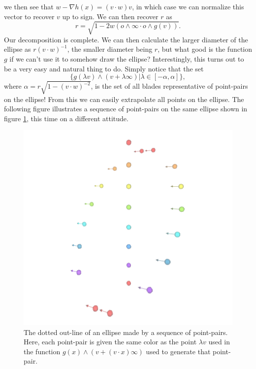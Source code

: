 \documentclass[12pt]{article}
\newcommand{\nvao}{o}
\newcommand{\nvai}{\infty}
\begin{document}
we then see that $w-\nabla h(x)=(v\cdot w)v$, in which case we can normalize
this vector to recover $v$ up to sign.  We can then recover $r$ as
\begin{equation*}
r = \sqrt{1-2w(\nvao\wedge\nvai\cdot\nvao\wedge g(v))}.
\end{equation*}
Our decomposition is complete.  We can then calculate the larger
diameter of the ellipse as $r(v\cdot w)^{-1}$, the smaller
diameter being $r$, but what good is the function $g$ if we can't
use it to somehow draw the ellipse?  Interestingly, this turns out to be a very
easy and natural thing to do.  Simply notice that the set
\begin{equation*}
\{g(\lambda v)\wedge(v+\lambda\nvai) | \lambda\in[-\alpha,\alpha]\},
\end{equation*}
where $\alpha=r\sqrt{1-(v\cdot w)^{-2}}$, is the set of all blades representative
of point-pairs on the ellipse!  From this we can easily extrapolate all points on the ellipse.
The following figure illustrates a sequence of point-pairs on the same ellipse
shown in figure \ref{fig_circles_of_ellipse}, this time on a different attitude.
\begin{figure}[H]
\centering
\includegraphics[scale=0.3]{PointPairsForEllipseFigure}
\caption{The dotted out-line of an ellipse made by a sequence of point-pairs.
Here, each point-pair is given the same color as the point $\lambda v$
used in the function $g(x)\wedge(v+(v\cdot x)\nvai)$ used to generate that point-pair.}
\label{fig_circles_of_ellipse}
\end{figure}
\end{document}
